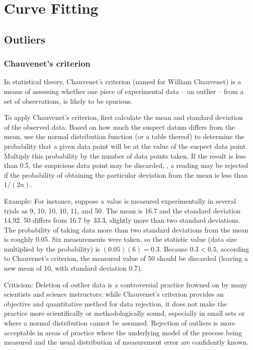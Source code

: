 \section{Curve Fitting}

\subsection{Outliers}

\subsubsection{Chauvenet's criterion}
In statistical theory, Chauvenet's criterion (named for William Chauvenet) is a means of assessing whether one piece of experimental data -- an outlier -- from a set of observations, is likely to be spurious.

To apply Chauvenet's criterion, first calculate the mean and standard deviation of the observed data. Based on how much the suspect datum differs from the mean, use the normal distribution function (or a table thereof) to determine the probability that a given data point will be at the value of the suspect data point. Multiply this probability by the number of data points taken. If the result is less than 0.5, the suspicious data point may be discarded, \ie, a reading may be rejected if the probability of obtaining the particular deviation from the mean is less than $1/(2n)$.

Example: For instance, suppose a value is measured experimentally in several trials as 9, 10, 10, 10, 11, and 50. The mean is 16.7 and the standard deviation 14.92. 50 differs from 16.7 by 33.3, slightly more than two standard deviations. The probability of taking data more than two standard deviations from the mean is roughly 0.05. Six measurements were taken, so the statistic value (data size multiplied by the probability) is $(0.05)(6) = 0.3$. Because $0.3 < 0.5$, according to Chauvenet's criterion, the measured value of 50 should be discarded (leaving a new mean of 10, with standard deviation 0.7).

Criticism: Deletion of outlier data is a controversial practice frowned on by many scientists and science instructors; while Chauvenet's criterion provides an objective and quantitative method for data rejection, it does not make the practice more scientifically or methodologically sound, especially in small sets or where a normal distribution cannot be assumed. Rejection of outliers is more acceptable in areas of practice where the underlying model of the process being measured and the usual distribution of measurement error are confidently known.


